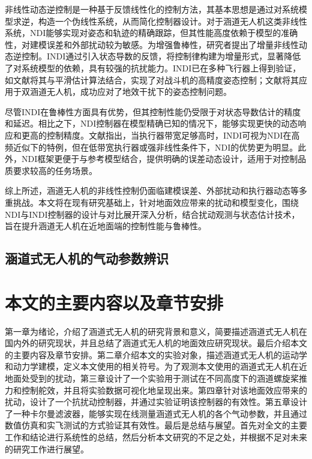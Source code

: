 非线性动态逆控制是一种基于反馈线性化的控制方法，其基本思想是通过对系统模型求逆，构造一个伪线性系统，从而简化控制器设计\cite{zhu1997NDI}。对于涵道无人机这类非线性系统，NDI能够实现对姿态和轨迹的精确跟踪，但其性能高度依赖于模型的准确性，对建模误差和外部扰动较为敏感\cite{zhang2015NDI}。为增强鲁棒性，研究者提出了增量非线性动态逆控制。INDI通过引入状态导数的反馈，将控制律构建为增量形式，显著降低了对系统模型的依赖，具有较强的抗扰能力\cite{wang2019flexible, smeur2016adaptive}。INDI已在多种飞行器上得到验证，如文献\cite{ludena2020flight}将其与平滑估计算法结合，实现了对战斗机的高精度姿态控制；文献\cite{Cheng2024INDI}将其应用于双涵道无人机，成功应对了地效干扰下的姿态控制问题。

尽管INDI在鲁棒性方面具有优势，但其控制性能仍受限于对状态导数估计的精度和延迟\cite{SteffensenINDI}。相比之下，NDI控制器在模型精确已知的情况下，能够实现更快的动态响应和更高的控制精度。文献指出，当执行器带宽足够高时，INDI可视为NDI在高频近似下的特例，但在低带宽执行器或强非线性条件下，NDI的优势更为明显\cite{SteffensenINDI}。此外，NDI框架更便于与参考模型结合，提供明确的误差动态设计，适用于对控制品质要求较高的任务场景。

综上所述，涵道无人机的非线性控制仍面临建模误差、外部扰动和执行器动态等多重挑战。本文将在现有研究基础上，针对地面效应带来的扰动和模型变化，围绕NDI与INDI控制器的设计与对比展开深入分析，结合扰动观测与状态估计技术，旨在提升涵道无人机在近地面端的控制性能与鲁棒性。


\subsection{涵道式无人机的气动参数辨识}


\section{本文的主要内容以及章节安排}
第一章为绪论，介绍了涵道式无人机的研究背景和意义，简要描述涵道式无人机在国内外的研究现状，并且总结了涵道式无人机的地面效应研究现状。最后介绍本文的主要内容及章节安排。第二章介绍本文的实验对象，描述涵道式无人机的运动学和动力学建模，定义本文使用的相关符号。为了观测本文使用的涵道式无人机在近地面处受到的扰动，第三章设计了一个实验用于测试在不同高度下的涵道螺旋桨推力和控制舵效，并且将实验数据可视化地呈现出来。第四章针对该地面效应带来的扰动，设计了一个抗扰动控制器，并通过实验证明该控制器的有效性。第五章设计了一种卡尔曼滤波器，能够实现在线测量涵道式无人机的各个气动参数，并且通过数值仿真和实飞测试的方式验证其有效性。最后是总结与展望。首先对全文的主要工作和结论进行系统性的总结，然后分析本文研究的不足之处，并根据不足对未来的研究工作进行展望。

